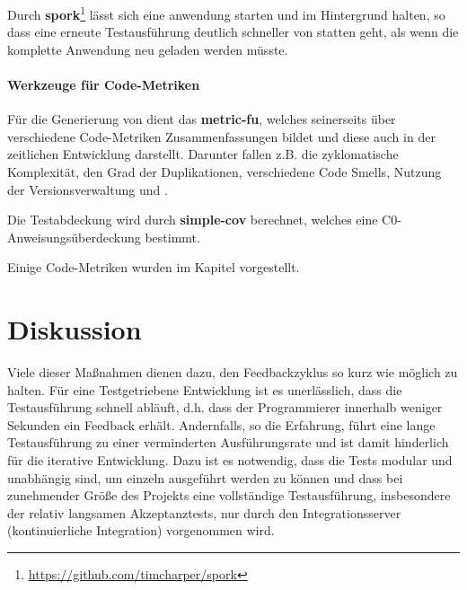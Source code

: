Durch \textbf{spork}\footnote{\url{https://github.com/timcharper/spork}} lässt sich eine anwendung starten und im Hintergrund halten, so dass eine erneute Testausführung deutlich schneller von statten geht, als wenn die komplette Anwendung neu geladen werden müsste.


\paragraph{Werkzeuge für Code-Metriken} Für die Generierung von  dient das  \textbf{metric-fu}, welches seinerseits über verschiedene Code-Metriken Zusammenfassungen bildet und diese auch in der zeitlichen Entwicklung darstellt. Darunter fallen z.B. die zyklomatische Komplexität, den Grad der Duplikationen, verschiedene Code Smells, Nutzung der Versionsverwaltung und .

Die Testabdeckung wird durch \textbf{simple-cov} berechnet, welches eine C0-Anweisungsüberdeckung bestimmt.

Einige Code-Metriken wurden im Kapitel  vorgestellt.


\section{Diskussion}

Viele dieser Maßnahmen dienen dazu, den Feedbackzyklus so kurz wie möglich zu halten. Für eine Testgetriebene Entwicklung ist es unerlässlich, dass die Testausführung schnell abläuft, d.h. dass der Programmierer innerhalb weniger Sekunden ein Feedback erhält. Andernfalls, so die Erfahrung, führt eine lange Testausführung zu einer verminderten Ausführungsrate und ist damit hinderlich für die iterative Entwicklung. Dazu ist es notwendig, dass die Tests modular und unabhängig sind, um einzeln ausgeführt werden zu können und dass bei zunehmender Größe des Projekts eine vollständige Testausführung, insbesondere der relativ langsamen Akzeptanztests, nur durch den Integrationsserver (kontinuierliche Integration) vorgenommen wird.

